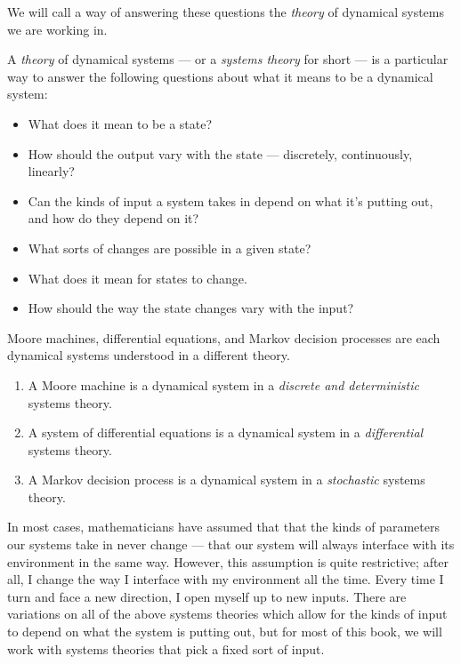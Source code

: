 \documentclass[DynamicalBook]{subfiles}
\begin{document}
We will call a way of answering these questions the \emph{theory} of dynamical
systems we are working in.
\begin{informal}\label{informal.doctrine}
  A \emph{theory} of dynamical systems --- or a \emph{systems theory} for short --- is a particular way to answer the following
  questions about what it means to be a dynamical system:
  \begin{itemize}
  \item What does it mean to be a state?
  \item How should the output vary with the state --- discretely,
    continuously, linearly?
  \item Can the kinds of input a
    system takes in depend on what it's putting out, and how do they depend on it?
  \item What sorts of changes are possible in a given state?
  \item What does it mean for states to change. 
  \item How should the way the state changes vary with the input?
  \end{itemize}
\end{informal}

Moore machines, differential equations, and Markov decision processes are each
dynamical systems understood in a different theory.
\begin{enumerate}
  \item A Moore machine is a dynamical system in a \emph{discrete and
      deterministic} systems theory.
  \item A system of differential equations is a dynamical system in a
    \emph{differential} systems theory.
  \item A Markov decision process is a dynamical system in a \emph{stochastic} systems theory.
\end{enumerate}

In most cases, mathematicians have assumed that that the kinds of parameters our systems take in
never change --- that our system will always interface with
    its environment in the same way. However, this assumption is quite
    restrictive; after all, I change the way I interface with my environment all
    the time. Every time I turn and face a new direction, I open myself up to
    new inputs. There are variations on all of the above systems theories which allow for the
    kinds of input to depend on what the system is putting out, but for most of this book, we will work with systems theories that pick a fixed sort of input.
\end{document}
